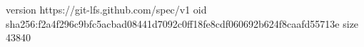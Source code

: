 version https://git-lfs.github.com/spec/v1
oid sha256:f2a4f296c9bfc5acbad08441d7092c0ff18fe8cdf060692b624f8caafd55713e
size 43840
